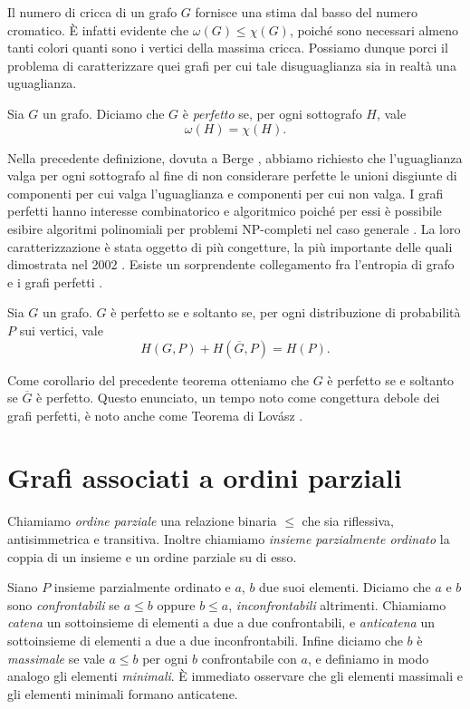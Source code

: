 Il numero di cricca di un grafo \(G\) fornisce una stima dal basso del numero cromatico. È infatti evidente che \(\omega(G)\le\chi(G)\), poiché sono necessari almeno tanti colori quanti sono i vertici della massima cricca. Possiamo dunque porci il problema di caratterizzare quei grafi per cui tale disuguaglianza sia in realtà una uguaglianza. 
\begin{definition}
	Sia \(G\) un grafo. Diciamo che \(G\) è \emph{perfetto} se, per ogni sottografo \(H\), vale
	\[\omega(H)=\chi(H).\]
\end{definition}
Nella precedente definizione, dovuta a Berge \cite{Berge1960}, abbiamo richiesto che l'uguaglianza valga per ogni sottografo al fine di non considerare perfette le unioni disgiunte di componenti per cui valga l'uguaglianza e componenti per cui non valga. I grafi perfetti hanno interesse combinatorico e algoritmico poiché per essi è possibile esibire algoritmi polinomiali per problemi NP-completi nel caso generale \cite{Golumbic2004}. La loro caratterizzazione è stata oggetto di più congetture, la più importante delle quali dimostrata nel 2002 \cite{Chudnovsky2006}. Esiste un sorprendente collegamento fra l'entropia di grafo e i grafi perfetti \cite{Csiszar1990}. 
\begin{theorem}
	 \label{lovasztheorem} Sia \(G\) un grafo. \(G\) è perfetto se e soltanto se, per ogni distribuzione di probabilità \(P\) sui vertici, vale
	\[H\left(G,P\right)+H\left(\overline{G},P\right)=H(P).\]
\end{theorem}
Come corollario del precedente teorema otteniamo che \(G\) è perfetto se e soltanto se \(\overline{G}\) è perfetto. Questo enunciato, un tempo noto come congettura debole dei grafi perfetti, è noto anche come Teorema di Lovász \cite{Lovasz1972}.

\section{Grafi associati a ordini parziali}

\begin{definition}
  Chiamiamo \emph{ordine parziale} una relazione binaria \(\le\) che sia riflessiva, antisimmetrica e transitiva. Inoltre chiamiamo \emph{insieme parzialmente ordinato} la coppia di un insieme e un ordine parziale su di esso.
\end{definition}

Siano \(P\) insieme parzialmente ordinato e \(a\), \(b\) due suoi elementi. Diciamo che \(a\) e \(b\) sono \emph{confrontabili} se \(a\le b\) oppure \(b\le a\), \emph{inconfrontabili} altrimenti. Chiamiamo \emph{catena} un sottoinsieme di elementi a due a due confrontabili, e \emph{anticatena} un sottoinsieme di elementi a due a due inconfrontabili. Infine diciamo che \(b\) è \emph{massimale} se vale \(a\le b\) per ogni \(b\) confrontabile con \(a\), e definiamo in modo analogo gli elementi \emph{minimali}. È immediato osservare che gli elementi massimali e gli elementi minimali formano anticatene.

